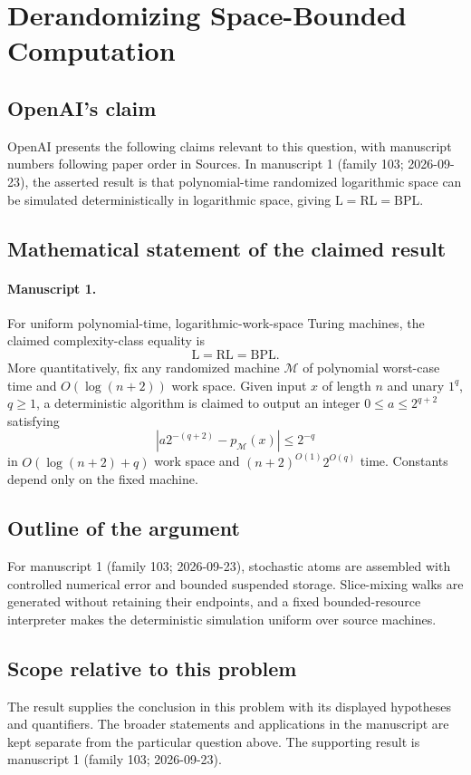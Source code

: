 \documentclass[11pt]{article}
\begin{document}
\section*{Derandomizing Space-Bounded Computation}

\subsection{OpenAI's claim}
OpenAI presents the following claims relevant to this question, with manuscript numbers following paper order in Sources. In manuscript 1 (family 103; 2026-09-23), the asserted result is that polynomial-time randomized logarithmic space can be simulated deterministically in logarithmic space, giving $\mathrm L=\mathrm{RL}=\mathrm{BPL}$.

\subsection{Mathematical statement of the claimed result}
\paragraph{Manuscript 1.}
For uniform polynomial-time, logarithmic-work-space Turing machines, the claimed complexity-class equality is
\[
 \mathrm L=\mathrm{RL}=\mathrm{BPL}.
\]
More quantitatively, fix any randomized machine $\mathcal M$ of polynomial worst-case time and $O(\log(n+2))$ work space. Given input $x$ of length $n$ and unary $1^q$, $q\ge1$, a deterministic algorithm is claimed to output an integer $0\le a\le2^{q+2}$ satisfying
\[
 |a2^{-(q+2)}-p_{\mathcal M}(x)|\le2^{-q}
\]
in $O(\log(n+2)+q)$ work space and $(n+2)^{O(1)}2^{O(q)}$ time. Constants depend only on the fixed machine.

\subsection{Outline of the argument}
For manuscript 1 (family 103; 2026-09-23), stochastic atoms are assembled with controlled numerical error and bounded suspended storage. Slice-mixing walks are generated without retaining their endpoints, and a fixed bounded-resource interpreter makes the deterministic simulation uniform over source machines.

\subsection{Scope relative to this problem}
The result supplies the conclusion in this problem with its displayed hypotheses and quantifiers. The broader statements and applications in the manuscript are kept separate from the particular question above. The supporting result is manuscript 1 (family 103; 2026-09-23).
\end{document}
